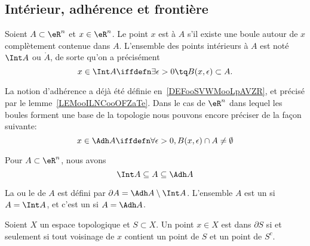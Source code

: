 \subsection{Intérieur, adhérence et frontière}

\begin{definition}
  Soient $A \subset \eR^n$ et $x \in \eR^n$. Le point $x$ est  à $A$ s'il existe une boule autour de $x$ complètement contenue dans $A$. L'ensemble des points intérieurs à $A$ est noté $\Int A$ ou $\mathring A$, de sorte qu'on a précisément
  \begin{equation*}
    x \in \Int A \iffdefn  \exists \epsilon > 0 \tq
    B(x,\epsilon) \subset A.
  \end{equation*}
\end{definition}

\begin{normaltext}

La notion d'adhérence a déjà été définie en~\ref{DEFooSVWMooLpAVZR}, et précisé par le lemme~\ref{LEMooILNCooOFZaTe}. Dans le cas de \( \eR^n\) dans lequel les boules forment une base de la topologie nous pouvons encore préciser de la façon suivante:
\begin{equation}
	x \in \Adh A \iffdefn \forall \epsilon > 0, B(x,\epsilon) \cap A \neq \emptyset
\end{equation}
\end{normaltext}

\begin{proposition}
Pour $A \subset \eR^n$, nous avons
\begin{equation*}
	\Int A \subseteq A  \subseteq \Adh A
\end{equation*}
\end{proposition}

\begin{definition}      \label{DEFooACVLooRwehTl}
  La  ou le  de $A$ est défini par $\partial A = \Adh A \setminus \Int A$. L'ensemble $A$ est un  si $A = \Int A$, et c'est un  si $A = \Adh A$.
\end{definition}

\begin{lemma}      \label{LEMooEUYEooYcUfKr}
    Soient \( X\) un espace topologique et \( S\subset X\). Un point \( x\in X\) est dans \( \partial S\) si et seulement si tout voisinage de \( x\) contient un point de \( S\) et un point de \( S^c\).
\end{lemma}


